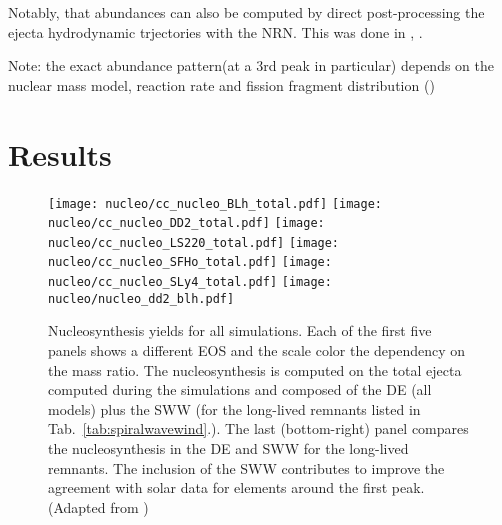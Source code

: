 Notably, that \rproc{} abundances can also be computed by direct 
post-processing the ejecta hydrodynamic trjectories with the \ac{NRN}. 
This was done in \eg, 
\citet{Goriely:2011vg,Korobkin:2012uy,Grossman:2013lqa,Wanajo:2014wha,Just:2014fka,Martin:2015hxa}.

Note: the exact \rproc{} abundance pattern(at a $3$rd peak in particular) depends on the nuclear mass model, reaction rate and fission fragment distribution (\citep[\eg][]{Goriely:2004qb,Arcones:2010dz,Mumpower:2011ar,Mendoza-Temis:2014mja,Eichler:2014kma})





\section{Results}


\begin{figure*}[t]
    \centering 
    \texttt{[image: nucleo/cc\_nucleo\_BLh\_total.pdf]}
    \texttt{[image: nucleo/cc\_nucleo\_DD2\_total.pdf]}
    \texttt{[image: nucleo/cc\_nucleo\_LS220\_total.pdf]}
    \texttt{[image: nucleo/cc\_nucleo\_SFHo\_total.pdf]}
    \texttt{[image: nucleo/cc\_nucleo\_SLy4\_total.pdf]}
    \texttt{[image: nucleo/nucleo\_dd2\_blh.pdf]}
    \caption{Nucleosynthesis yields for all simulations. Each %
        of the first five panels 
        shows a different EOS and the scale color the dependency on the
        mass ratio. The nucleosynthesis is computed on the total ejecta
        computed during the simulations and 
        composed of the \ac{DE} (all models) plus the \ac{SWW} 
        (for the long-lived remnants listed in
        Tab.~\ref{tab:spiralwavewind}.).
        The last (bottom-right) panel compares the nucleosynthesis in
        the \ac{DE} and \ac{SWW} for the long-lived
        remnants. The inclusion of the \ac{SWW} contributes to 
        improve the agreement with solar data for elements around the first peak.
        (Adapted from \citet{Nedora:2020pak})
    }
    \label{fig:nucle:totalyields}
\end{figure*}



